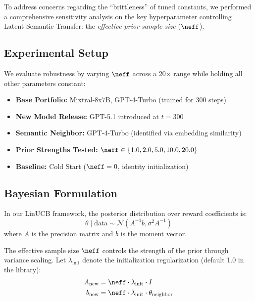 

To address concerns regarding the ``brittleness'' of tuned constants, we performed 
a comprehensive sensitivity analysis on the key hyperparameter controlling Latent 
Semantic Transfer: the \emph{effective prior sample size} ($\neff$).

\subsection{Experimental Setup}

We evaluate robustness by varying $\neff$ across a 20$\times$ range while 
holding all other parameters constant:

\begin{itemize}[leftmargin=*,noitemsep]
    \item \textbf{Base Portfolio:} Mixtral-8x7B, GPT-4-Turbo (trained for 300 steps)
    \item \textbf{New Model Release:} GPT-5.1 introduced at $t=300$
    \item \textbf{Semantic Neighbor:} GPT-4-Turbo (identified via embedding similarity)
    \item \textbf{Prior Strengths Tested:} $\neff \in \{1.0, 2.0, 5.0, 10.0, 20.0\}$
    \item \textbf{Baseline:} Cold Start ($\neff=0$, identity initialization)
\end{itemize}

\subsection{Bayesian Formulation}

In our LinUCB framework, the posterior distribution over reward coefficients is:
\begin{equation}
\theta \mid \text{data} \sim \mathcal{N}(A^{-1}b, \sigma^2 A^{-1})
\end{equation}
where $A$ is the precision matrix and $b$ is the moment vector.

The effective sample size $\neff$ controls the strength of the prior
through variance scaling.  Let $\lambda_{\text{init}}$ denote the
initialization regularization (default 1.0 in the library):
\begin{align}
A_{\text{new}} &= \neff \cdot \lambda_{\text{init}} \cdot I \label{eq:prior_precision} \\
b_{\text{new}} &= \neff \cdot \lambda_{\text{init}} \cdot \theta_{\text{neighbor}} \label{eq:prior_moment}
\end{align}

